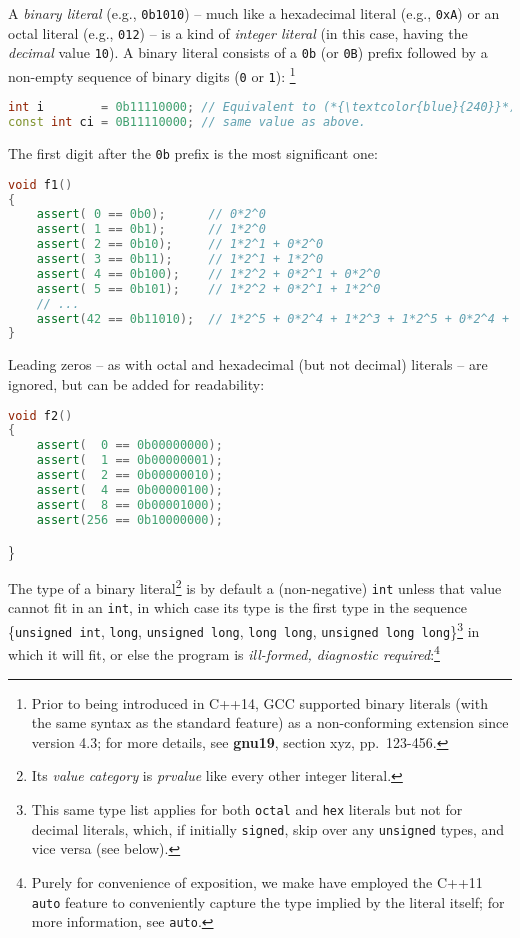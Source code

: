 \documentclass[twoside,10pt,letterpaper,usenames]{newstyle-PearsonGeneric-7-38}
\begin{document}
A \emph{binary literal} (e.g., \texttt{0b1010}) -- much like a
hexadecimal literal (e.g., \texttt{0xA}) or an octal literal (e.g.,
\texttt{012}) -- is a kind of \emph{integer literal} (in this case,
having the \emph{decimal} value \texttt{10}). A binary literal consists
of a \texttt{0b} (or \texttt{0B}) prefix followed by a non-empty
sequence of binary digits (\texttt{0} or \texttt{1}):
{\cprotect\footnote{Prior to being introduced in C++14, GCC supported
  binary literals (with the same syntax as the standard feature) as a
  non-conforming extension since version 4.3; for more details, see
  \textbf{gnu19}, section xyz, pp.~123-456.}}

\begin{lstlisting}[language=C++]
int i        = 0b11110000; // Equivalent to (*{\textcolor{blue}{240}}*), (*{\textcolor{blue}{0360}}*), or (*{\textcolor{blue}{0xF0}}*)
const int ci = 0B11110000; // same value as above.
\end{lstlisting}
    

The first digit after the \texttt{0b} prefix is the most significant
one:

\begin{lstlisting}[language=C++]
void f1()
{
    assert( 0 == 0b0);      // 0*2^0
    assert( 1 == 0b1);      // 1*2^0
    assert( 2 == 0b10);     // 1*2^1 + 0*2^0
    assert( 3 == 0b11);     // 1*2^1 + 1*2^0
    assert( 4 == 0b100);    // 1*2^2 + 0*2^1 + 0*2^0
    assert( 5 == 0b101);    // 1*2^2 + 0*2^1 + 1*2^0
    // ...
    assert(42 == 0b11010);  // 1*2^5 + 0*2^4 + 1*2^3 + 1*2^5 + 0*2^4 + 1*2^3
}
\end{lstlisting}
    

Leading zeros -- as with octal and hexadecimal (but not decimal)
literals -- are ignored, but can be added for readability:

\begin{lstlisting}[language=C++]
void f2()
{
    assert(  0 == 0b00000000);
    assert(  1 == 0b00000001);
    assert(  2 == 0b00000010);
    assert(  4 == 0b00000100);
    assert(  8 == 0b00001000);
    assert(256 == 0b10000000);
\end{lstlisting}
    

\}

The type of a binary literal{\cprotect\footnote{Its \emph{value
  category} is \emph{prvalue} like every other integer literal.}} is by
default a (non-negative) \texttt{int} unless that value cannot fit in an
\texttt{int}, in which case its type is the first type in the sequence
\{\texttt{unsigned int}, \texttt{long}, \texttt{unsigned long},
\texttt{long long}, \texttt{unsigned long long}\}{\cprotect\footnote{This
  same type list applies for both \texttt{octal} and \texttt{hex}
  literals but not for decimal literals, which, if initially
  \texttt{signed}, skip over any \texttt{unsigned} types, and vice versa
  (see below).}} in which it will fit, or else the program is
\emph{ill-formed, diagnostic required}:{\cprotect\footnote{Purely for
  convenience of exposition, we make have employed the C++11
  \texttt{auto} feature to conveniently capture the type implied by the
  literal itself; for more information, see \texttt{auto}.}}
\end{document}
